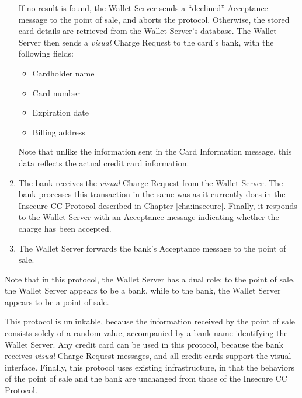 \begin{enumerate}
    If no result is found, the Wallet Server sends a ``declined'' Acceptance message to the point of sale, and aborts the protocol.
	Otherwise, the stored card details are retrieved from the Wallet Server's database.
    The Wallet Server then sends a \emph{visual} Charge Request to the card's bank, with the following fields:
    \begin{itemize}
    \item Cardholder name
    \item Card number
    \item Expiration date
    \item Billing address
    \end{itemize}
    Note that unlike the information sent in the Card Information message, this data reflects the actual credit card information.
\item The bank receives the \emph{visual} Charge Request from the Wallet Server.
    The bank processes this transaction in the same was as it currently does in the Insecure CC Protocol described in Chapter \ref{cha:insecure}.
    Finally, it responds to the Wallet Server with an Acceptance message indicating whether the charge has been accepted.
\item The Wallet Server forwards the bank's Acceptance message to the point of sale.
\end{enumerate}

Note that in this protocol, the Wallet Server has a dual role:
to the point of sale, the Wallet Server appears to be a bank, while to the bank, the Wallet Server appears to be a point of sale.

This protocol is unlinkable,
    because the information received by the point of sale consists solely of a random value, accompanied by a bank name identifying the Wallet Server.
Any credit card can be used in this protocol,
    because the bank receives \emph{visual} Charge Request messages, and all credit cards support the visual interface.
Finally, this protocol uses existing infrastructure,
    in that the behaviors of the point of sale and the bank are unchanged from those of the Insecure CC Protocol.
